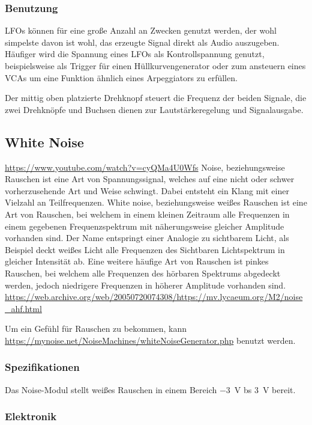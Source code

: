 \subsubsection{Benutzung}
\label{sec:org7cddf73}
LFOs können für eine große Anzahl an Zwecken genutzt werden, der wohl simpelste davon ist wohl, das erzeugte Signal direkt als Audio auszugeben. Häufiger wird die Spannung eines LFOs als Kontrollspannung genutzt, beispielsweise als Trigger für einen Hüllkurvengenerator oder zum ansteuern eines VCAs um eine Funktion ähnlich eines Arpeggiators zu erfüllen.

Der mittig oben platzierte Drehknopf steuert die Frequenz der beiden Signale, die zwei Drehknöpfe und Buchsen dienen zur Lautstärkeregelung und Signalausgabe.

\subsection{White Noise}
\label{sec:org77a2fe0}
\url{https://www.youtube.com/watch?v=cyQMa4U0Wfs}
Noise, beziehungsweise Rauschen ist eine Art von Spannungssignal, welches auf eine nicht oder schwer vorherzusehende Art und Weise schwingt. Dabei entsteht ein Klang mit einer Vielzahl an Teilfrequenzen. White noise, beziehungsweise weißes Rauschen ist eine Art von Rauschen, bei welchem in einem kleinen Zeitraum alle Frequenzen in einem gegebenen Frequenzspektrum mit näherungsweise gleicher Amplitude vorhanden sind. Der Name entspringt einer Analogie zu sichtbarem Licht, als Beispiel deckt weißes Licht alle Frequenzen des Sichtbaren Lichtspektrum in gleicher Intensität ab. Eine weitere häufige Art von Rauschen ist pinkes Rauschen, bei welchem alle Frequenzen des hörbaren Spektrums abgedeckt werden, jedoch niedrigere Frequenzen in höherer Amplitude vorhanden sind.
\url{https://web.archive.org/web/20050720074308/https://mv.lycaeum.org/M2/noise\_ahf.html}

Um ein Gefühl für Rauschen zu bekommen, kann \url{https://mynoise.net/NoiseMachines/whiteNoiseGenerator.php} benutzt werden.

\subsubsection{Spezifikationen}
\label{sec:orgb1af524}
Das Noise-Modul stellt weißes Rauschen in einem Bereich \SI{-3}{\volt} bs \SI{3}{\volt} bereit.

\subsubsection{Elektronik}
\label{sec:org54db433}
